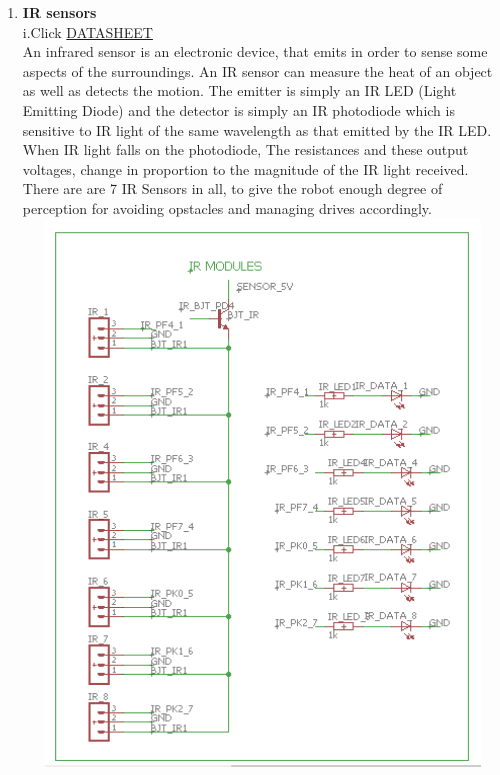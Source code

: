 \documentclass[a4paper,12pt,oneside]{book}
\begin{document}
\begin{enumerate}
    \item \textbf{IR sensors}\\
    i.Click \href{https://www.vishay.com/docs/83760/tcrt5000.pdf}{DATASHEET}
    \\[0.5cm]An infrared sensor is an electronic device, that emits in order to sense some aspects of the surroundings. An IR sensor can measure the heat of an object as well as detects the motion. The emitter is simply an IR LED (Light Emitting Diode) and the detector is simply an IR photodiode which is sensitive to IR light of the same wavelength as that emitted by the IR LED. When IR light falls on the photodiode, The resistances and these output voltages, change in proportion to the magnitude of the IR light received.
    There are are 7 IR Sensors in all, to give the robot enough degree of perception for avoiding opstacles and managing drives accordingly.
    \\\hfill\includegraphics[width=13cm, height=14.5cm]{IR_sensor}
    

\end{enumerate}
\end{document}
